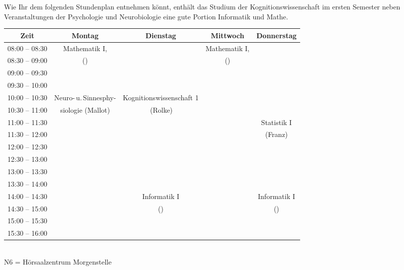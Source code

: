 Wie Ihr dem folgenden Stundenplan entnehmen könnt, enthält das Studium der Kognitionswissenschaft
im ersten Semester neben Veranstaltungen der Psychologie und Neurobiologie eine gute Portion Informatik und Mathe.\\


\noindent{}

\begin{center}
\footnotesize
\begin{tabular}{|c|c|c|c|c|} \hline
Zeit      & 			Montag 		& Dienstag							& Mittwoch 			& Donnerstag  \\\hline\hline
08:00 -- 08:30  & 		Mathematik I, 	&									& Mathematik I, 	& \\
\cline{1-1}\cline{3-3}\cline{5-5}
08:30 -- 09:00  & 	(\Matheprof)	 & 									& (\Matheprof)	&  \\
\hline
09:00 -- 09:30  & 		 & 									& 	&  \\
\hline
09:30 -- 10:00 &  & & &\\
\hline
10:00 -- 10:30  &   Neuro-\,u.\,Sinnesphy- & Kognitionswissenschaft  1& & \\
\cline{1-1}\cline{4-5}
10:30 -- 11:00 &   siologie (Mallot)  &  \,(Rolke) & & \\
\hline
11:00 -- 11:30 &  &  & 					& Statistik I \\
\cline{1-4}
11:30 -- 12:00 & 	&	& 					& (Franz)\\
\hline
12:00 -- 12:30 & & & & \\
\hline
12:30 -- 13:00 & & & & \\
\hline
13:00 -- 13:30 & & & & \\
\hline
13:30 -- 14:00 & & & & \\
\hline
14:00 -- 14:30 &  						&	Informatik I					&					 &   Informatik I\\
\cline{1-2}\cline{4-4}
14:30 -- 15:00 &  						&   (\Infoprof)				&					&   (\Infoprof)	\\
\hline
15:00 -- 15:30 & & & &\\
\hline
15:30 -- 16:00 & & & &\\
\hline
\end{tabular}\\
\scriptsize  N6 = Hörsaalzentrum Morgenstelle
\end{center}


